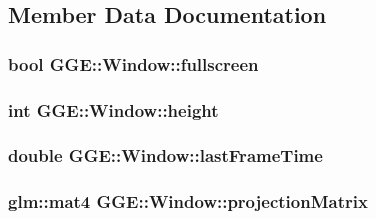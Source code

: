\subsection{Member Data Documentation}
\hypertarget{class_g_g_e_1_1_window_a43b2bb5a05e9f6d7af76086ce42145f2}{
\subsubsection[{fullscreen}]{\setlength{\rightskip}{0pt plus 5cm}bool G\+G\+E\+::\+Window\+::fullscreen\hspace{0.3cm}{\ttfamily [private]}}}\label{class_g_g_e_1_1_window_a43b2bb5a05e9f6d7af76086ce42145f2}
\hypertarget{class_g_g_e_1_1_window_a2aef17e23370755f4c3de24e527676ff}{
\subsubsection[{height}]{\setlength{\rightskip}{0pt plus 5cm}int G\+G\+E\+::\+Window\+::height\hspace{0.3cm}{\ttfamily [private]}}}\label{class_g_g_e_1_1_window_a2aef17e23370755f4c3de24e527676ff}
\hypertarget{class_g_g_e_1_1_window_ab93d7f77e803a854ef5188d5ce039838}{
\subsubsection[{last\+Frame\+Time}]{\setlength{\rightskip}{0pt plus 5cm}double G\+G\+E\+::\+Window\+::last\+Frame\+Time\hspace{0.3cm}{\ttfamily [private]}}}\label{class_g_g_e_1_1_window_ab93d7f77e803a854ef5188d5ce039838}
\hypertarget{class_g_g_e_1_1_window_acc1dfe541ecdf8c1ca08eec451ea7aba}{
\subsubsection[{projection\+Matrix}]{\setlength{\rightskip}{0pt plus 5cm}glm\+::mat4 G\+G\+E\+::\+Window\+::projection\+Matrix\hspace{0.3cm}{\ttfamily [private]}}}\label{class_g_g_e_1_1_window_acc1dfe541ecdf8c1ca08eec451ea7aba}
